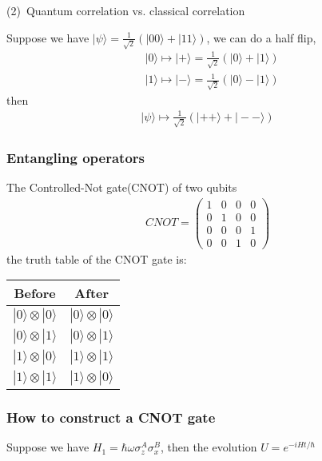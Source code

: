 \documentclass[UTF8,12pt]{article} %
\begin{document}
(2)~Quantum correlation vs. classical correlation\\\par
Suppose we have $|\psi\rangle = \frac{1}{\sqrt{2}}\left(|00\rangle + |11\rangle\right)$, we can do a half flip,
\begin{align*}
& |0\rangle\longmapsto|+\rangle = \frac{1}{\sqrt{2}}(|0\rangle+|1\rangle)\\
& |1\rangle\longmapsto|-\rangle = \frac{1}{\sqrt{2}}(|0\rangle-|1\rangle)
\end{align*}
then
\begin{align*}
|\psi\rangle\longmapsto \frac{1}{\sqrt{2}}\left(|++\rangle + |--\rangle\right)
\end{align*}

\subsubsection{Entangling operators}
The Controlled-Not gate(CNOT) of two qubits
\begin{align}
CNOT = \begin{pmatrix}1&0&0&0\\0&1&0&0\\0&0&0&1\\0&0&1&0\end{pmatrix}
\end{align}
the truth table of the CNOT gate is:
\begin{table}[H]\centering
\begin{tabular}{|c|c|}\hline
Before&After\\ \hline
$|0\rangle\otimes|0\rangle$ & $|0\rangle\otimes|0\rangle$\\ \hline
$|0\rangle\otimes|1\rangle$ & $|0\rangle\otimes|1\rangle$\\ \hline
$|1\rangle\otimes|0\rangle$ & $|1\rangle\otimes|1\rangle$\\ \hline
$|1\rangle\otimes|1\rangle$ & $|1\rangle\otimes|0\rangle$\\ \hline
\end{tabular}
\end{table}

\subsubsection{How to construct a CNOT gate}
Suppose we have $H_1 =\hbar\omega\sigma_z^A\sigma_x^B$, then the evolution $U = e^{-iHt/\hbar}$
\end{document}
